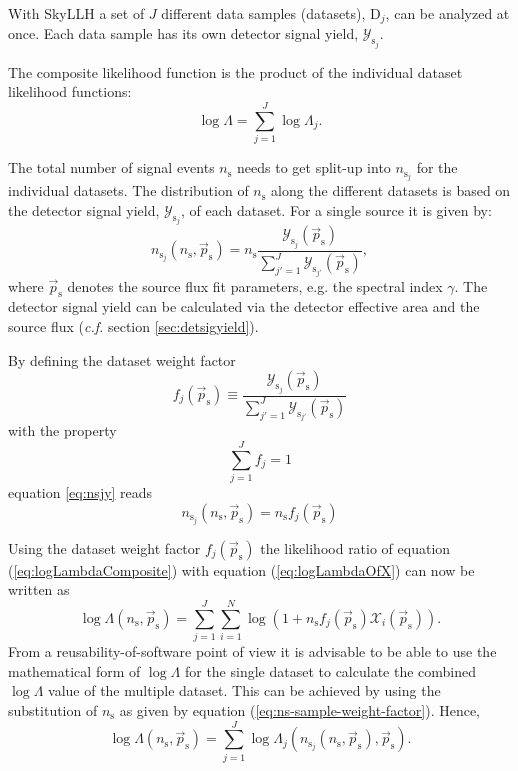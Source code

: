 \documentclass{article}
\newcommand{\eq}[1]{(\ref{#1})}
\newcommand{\ns}{n_{\mathrm{s}}}
\newcommand{\ps}{\vec{p}_{\mathrm{s}}}
\begin{document}
With SkyLLH a set of $J$ different data samples (datasets), $\mathrm{D}_j$, can
be analyzed at once. Each data sample has its own detector signal yield,
$\mathcal{Y}_{\mathrm{s}_j}$.

The composite likelihood function is the product of the individual dataset
likelihood functions:
\begin{equation}
 \log \Lambda = \sum_{j=1}^{J} \log \Lambda_j.
 \label{eq:logLambdaComposite}
\end{equation}

The total number of signal events $\ns$ needs to get split-up into
$n_{\mathrm{s}_j}$ for the individual datasets. The distribution of $\ns$
along the different datasets is based on the detector signal yield,
$\mathcal{Y}_{\mathrm{s}_j}$, of each dataset. For a single source it is given by:
\begin{equation}
 n_{\mathrm{s}_j}(\ns,\ps) = \ns \frac{\mathcal{Y}_{\mathrm{s}_j}(\ps)}{\sum_{j'=1}^{J} \mathcal{Y}_{\mathrm{s}_{j'}}(\ps)},
 \label{eq:nsjy}
\end{equation}
where $\ps$ denotes the source flux fit parameters, e.g.
the spectral index $\gamma$. The detector signal yield can be
calculated via the detector effective area and the source flux (\emph{c.f.}
section \ref{sec:detsigyield}).

By defining the dataset weight factor
\begin{equation}
 f_j(\ps) \equiv \frac{\mathcal{Y}_{\mathrm{s}_j}(\ps)}{\sum_{j'=1}^{J} \mathcal{Y}_{\mathrm{s}_{j'}}(\ps)}
 \label{eq:dataset-weight-factor-single-source}
\end{equation}
with the property
\begin{equation}
 \sum_{j=1}^{J} f_j = 1
\end{equation}
equation \ref{eq:nsjy} reads
\begin{equation}
 n_{\mathrm{s}_j}(\ns,\ps) = \ns f_{j}(\ps)
 \label{eq:ns-sample-weight-factor}
\end{equation}

Using the dataset weight factor $f_{j}(\ps)$ the likelihood ratio of
equation \eq{eq:logLambdaComposite} with equation \eq{eq:logLambdaOfX} can now
be written as
\begin{equation}
 \log \Lambda(\ns,\ps) = \sum_{j=1}^{J} \sum_{i=1}^{N} \log (1 + \ns f_{j}(\ps)\mathcal{X}_i(\ps)).
\end{equation}
From a reusability-of-software point of view it is advisable to be able to use
the mathematical form of $\log \Lambda$ for the single dataset to calculate the
combined $\log \Lambda$ value of the multiple dataset. This can be achieved by
using the substitution of $\ns$ as given by equation (\ref{eq:ns-sample-weight-factor}).
Hence,
\begin{equation}
 \log \Lambda(\ns,\ps) = \sum_{j=1}^{J} \log \Lambda_j(n_{\mathrm{s}_j}(\ns,\ps),\ps).
 \label{eq:logLambdaOfLogLambdaj}
\end{equation}
\end{document}

